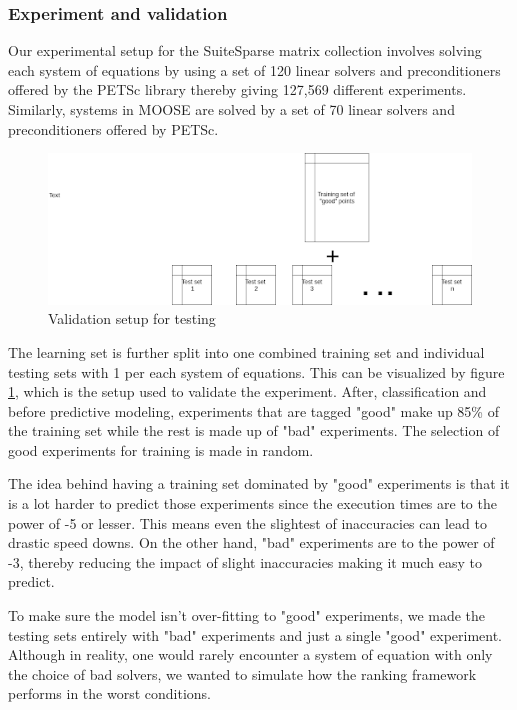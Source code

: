 \subsubsection{Experiment and validation}
Our experimental setup for the SuiteSparse matrix collection involves solving each system of equations by using a set of 120 linear solvers and preconditioners offered by the PETSc library thereby giving 127,569 different experiments. Similarly, systems in MOOSE are solved by a set of 70 linear solvers and preconditioners offered by PETSc. 


\begin{figure}
    \centering
    \includegraphics[width=1\columnwidth]{figures/rank_split.png}
    \caption{Validation setup for testing}
    \label{Validation setup for testing}
\end{figure}

The learning set is further split into one combined training set and individual testing sets with 1 per each system of equations. This can be visualized by figure \ref{Validation setup for testing}, which is the setup used to validate the experiment. After, classification and before predictive modeling, experiments that are tagged "good" make up 85\% of the training set while the rest is made up of "bad" experiments. The selection of good experiments for training is made in random.

The idea behind having a training set dominated by "good" experiments is that it is a lot harder to predict those experiments since the execution times are to the power of -5 or lesser. This means even the slightest of inaccuracies can lead to drastic speed downs. On the other hand, "bad" experiments are to the power of -3, thereby reducing the impact of slight inaccuracies making it much easy to predict.

To make sure the model isn't over-fitting to "good" experiments, we made the testing sets entirely with "bad" experiments and just a single "good" experiment. Although in reality, one would rarely encounter a system of equation with only the choice of bad solvers, we wanted to simulate how the ranking framework performs in the worst conditions. 













